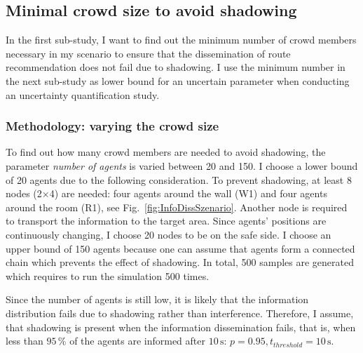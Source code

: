 \subsection{Minimal crowd size to avoid shadowing}

In the first sub-study, I want to find out the minimum number of crowd members necessary in my scenario to ensure that the dissemination of route recommendation does not fail due to shadowing. I use the minimum number in the next sub-study as lower bound for an uncertain parameter when conducting an uncertainty quantification study.


\subsubsection{Methodology: varying the crowd size}
To find out how many crowd members are needed to avoid shadowing, the parameter \textit{number of agents} is varied between 20 and 150.  I choose a lower bound of 20 agents due to the following consideration. To prevent shadowing, at least 8 nodes (2$\times$4) are needed: four agents around the wall (W1) and four agents around the room (R1), see Fig.~\ref{fig:InfoDissSzenario}. Another node is required to transport the information to the target area. Since agents' positions are continuously changing, I choose 20 nodes to be on the safe side. I choose an upper bound of 150 agents because one can assume that agents form a connected chain which prevents the effect of shadowing. In total, 500 samples are generated which requires to run the simulation 500 times. 

Since the number of agents is still low, it is likely that the information distribution fails due to shadowing rather than interference. Therefore, I assume, that shadowing is present when the information dissemination fails, that is, when less than $95\,$\% of the agents are informed after $10\,\text{s}$: $p=0.95, t_{threshold}=10\,\text{s}$.  

